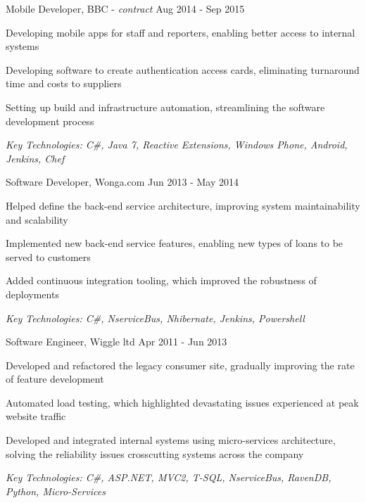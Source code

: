 \documentclass[11pt,article,oneside]{memoir}
\newenvironment{itemize*}{%
  \renewcommand\labelitemi{\textbullet}
  \footnotesize
  \begin{itemize}%
    \setlength{\itemsep}{0pt}}%
  {\end{itemize}
}
\begin{document}
\normalsize
\medskip
\ind Mobile Developer, BBC - \emph{contract} \hfill Aug 2014 - Sep 2015
\begin{itemize*}
  \item Developing mobile apps for staff and reporters, enabling better access to internal systems
  \item Developing software to create authentication access cards, eliminating turnaround time and costs to suppliers
  \item Setting up build and infrastructure automation, streamlining the software development process
\end{itemize*}
\ind \hspace{0.35in} \footnotesize \emph{Key Technologies: C\#, Java 7, Reactive Extensions, Windows Phone, Android, Jenkins, Chef}

\normalsize
\medskip
\ind Software Developer, Wonga.com \hfill Jun 2013 - May 2014
\begin{itemize*}
  \item Helped define the back-end service architecture, improving system maintainability and scalability
  \item Implemented new back-end service features, enabling new types of loans to be served to customers
  \item Added continuous integration tooling, which improved the robustness of deployments
\end{itemize*}
\ind \hspace{0.35in} \footnotesize \emph{Key Technologies: C\#, NserviceBus, Nhibernate, Jenkins, Powershell}

\normalsize
\medskip
\ind Software Engineer, Wiggle ltd \hfill Apr 2011 - Jun 2013
\begin{itemize*}
  \item Developed and refactored the legacy consumer site, gradually improving the rate of feature development  
  \item Automated load testing, which highlighted devastating issues experienced at peak website traffic
  \item Developed and integrated internal systems using micro-services architecture, solving the reliability issues crosscutting systems across the company 
\end{itemize*}
\ind \hspace{0.35in} \footnotesize \emph{Key Technologies: C\#, ASP.NET, MVC2, T-SQL, NserviceBus, RavenDB, Python, Micro-Services}

\normalsize
\bigskip
{}
\end{document}
